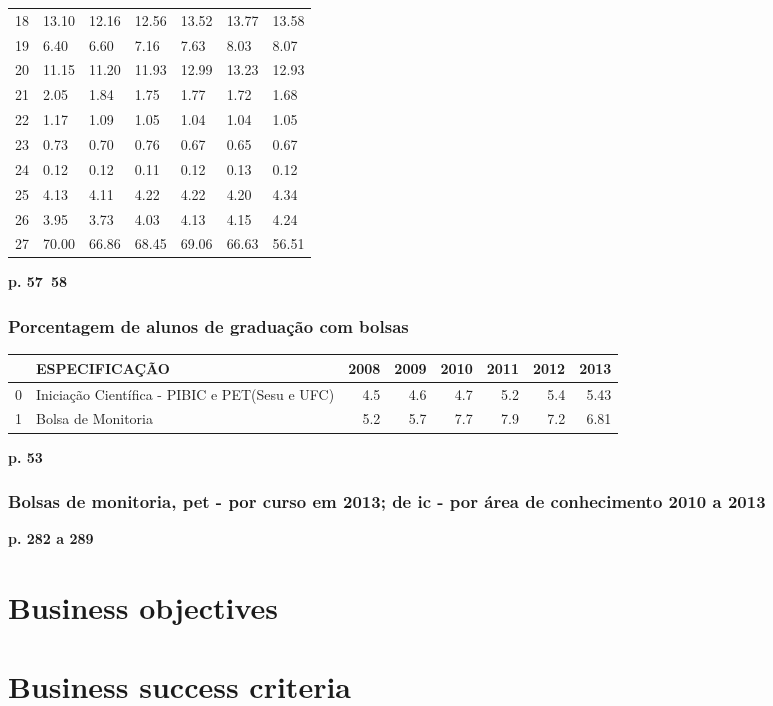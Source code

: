 \documentclass{report}
\begin{document}
\begin{tabular}{lllllll}
18        &  13.10 &  12.16 &  12.56 &  13.52 &  13.77 &  13.58 \\
19        &  6.40 &  6.60 &  7.16 &  7.63 &  8.03 &  8.07 \\
20        &  11.15 &  11.20 &  11.93 &  12.99 &  13.23 &  12.93 \\
21        &  2.05 &  1.84 &  1.75 &  1.77 &  1.72 &  1.68 \\
22        &  1.17 &  1.09 &  1.05 &  1.04 &  1.04 &  1.05 \\
23        &  0.73 &  0.70 &  0.76 &  0.67 &  0.65 &  0.67 \\
24        &  0.12 &  0.12 &  0.11 &  0.12 &  0.13 &  0.12 \\
25        &  4.13 &  4.11 &  4.22 &  4.22 &  4.20 &  4.34 \\
26        &  3.95 &  3.73 &  4.03 &  4.13 &  4.15 &  4.24 \\
27        &  70.00 &  66.86 &  68.45 &  69.06 &  66.63 &  56.51 \\
\bottomrule
\end{tabular}

\textbf{p. 57~58}

\subsection{Porcentagem de alunos de graduação com bolsas}
\begin{tabular}{llrrrrrr}
\toprule
{} &                                   ESPECIFICAÇÃO &  2008 &  2009 &  2010 &  2011 &  2012 &  2013 \\
\midrule
0 &  Iniciação Científica - PIBIC e PET(Sesu e UFC) &   4.5 &   4.6 &   4.7 &   5.2 &   5.4 &  5.43 \\
1 &                              Bolsa de Monitoria &   5.2 &   5.7 &   7.7 &   7.9 &   7.2 &  6.81 \\
\bottomrule
\end{tabular}

\textbf{p. 53}

\subsection{Bolsas de monitoria, pet - por curso em 2013; de ic - por área de conhecimento 2010 a 2013}
\textbf{p. 282 a 289}

\chapter{Business objectives}

\chapter{Business success criteria}

\cite{anuario_2014_base_2013}
\cite{pdi_ufc}



\end{document}
